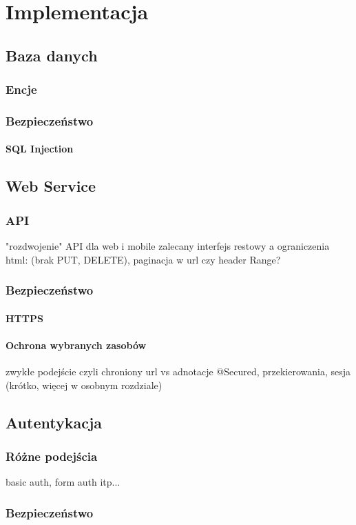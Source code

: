 \documentclass[11pt]{aghdpl}
\begin{document}
\chapter{Implementacja}

\section{Baza danych}
\subsection{Encje}
\subsection{Bezpieczeństwo}
\subsubsection{SQL Injection}
\section{Web Service}
\subsection{API}
"rozdwojenie" API dla web i mobile
zalecany interfejs restowy a ograniczenia html: (brak PUT, DELETE), paginacja w url czy header Range?
\subsection{Bezpieczeństwo}
\subsubsection{HTTPS}
\subsubsection{Ochrona wybranych zasobów}
zwykłe podejście czyli chroniony url vs adnotacje
@Secured, przekierowania, sesja (krótko, więcej w osobnym rozdziale)
\section{Autentykacja}
\subsection{Różne podejścia}
basic auth, form auth itp...
\subsection{Bezpieczeństwo}
\end{document}
